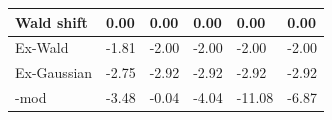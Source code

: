 \begin{tabular}{|l|l|l|l|l|l|}
\hline
Wald shift&0.00&0.00&0.00&0.00&0.00\\\hline
Ex-Wald&-1.81&-2.00&-2.00&-2.00&-2.00\\\hline
Ex-Gaussian&-2.75&-2.92&-2.92&-2.92&-2.92\\\hline
\rocdd{}-mod&-3.48&-0.04&-4.04&-11.08&-6.87\\\hline
\end{tabular}
